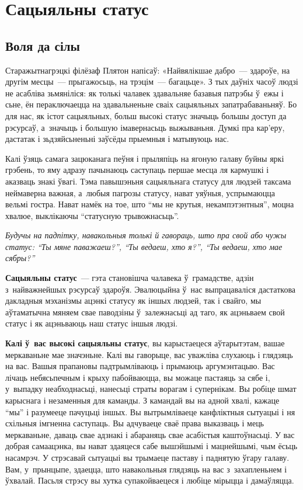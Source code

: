 \chapter{Сацыяльны статус}

\section{Воля да сілы}

Старажытнагрэцкі філёзаф Плятон напісаў: «Найвялікшае дабро~--- здароўе, на другім месцы~--- прыгажосьць, на трэцім~--- багацьце». З тых даўніх часоў людзі не асабліва зьмяніліся: як толькі чалавек здавальняе базавыя патрэбы ў~ежы і сьне, ён пераключаецца на здавальненьне сваіх сацыяльных запатрабаваньняў. Бо для нас, як істот сацыяльных, больш высокі статус значыць большы доступ да рэсурсаў, а~значыць і большую імавернасьць выжываньня. Думкі пра кар'еру, дастатак і зьдзяйсьненьні заўсёды прыемныя і матывуюць нас.

Калі ўзяць самага зацюканага пеўня і прыляпіць на ягоную галаву буйны яркі грэбень, то яму адразу пачынаюць саступаць першае месца ля кармушкі і аказваць знакі ўвагі. Тэма павышэньня сацыяльнага статусу для людзей таксама неймаверна важная, а~любыя пагрозы статусу, нават уяўныя, успрымаюцца вельмі гостра. Нават намёк на тое, што ``мы не крутыя, некампэтэнтныя'', моцна хвалюе, выклікаючы ``статусную трывожнасьць''.

\emph{Будучы на падпітку, навакольныя толькі й гавораць, што пра свой або чужы статус: ``Ты мяне паважаеш?'', ``Ты ведаеш, хто я?'', ``Ты ведаеш, хто мае сябры?''}

\textbf{Сацыяльны статус}~--- гэта становішча чалавека ў~грамадстве, адзін з~найважнейшых рэсурсаў здароўя. Эвалюцыйна ў~нас выпрацаваліся дастаткова дакладныя мэханізмы ацэнкі статусу як іншых людзей, так і свайго, мы аўтаматычна мяняем свае паводзіны ў~залежнасьці ад таго, як ацэньваем свой статус і як ацэньваюць наш статус іншыя людзі.


\textbf{Калі ў~вас высокі сацыяльны статус}, вы карыстаецеся аўтарытэтам, вашае меркаваньне мае значэньне. Калі вы гаворыце, вас уважліва слухаюць і глядзяць на вас. Вашыя прапановы падтрымліваюць і прымаюць аргумэнтацыю. Вас лічаць небясьпечным і крыху пабойваюцца, вы можаце пастаяць за сябе і, у~выпадку неабходнасьці, нанесьці страты ворагам і супернікам. Вы робіце шмат карыснага і незаменныя для каманды. З камандай вы на адной хвалі, кажаце ``мы'' і разумееце пачуцьці іншых. Вы вытрымліваеце канфліктныя сытуацыі і ня схільныя імгненна саступаць. Вы адчуваеце сваё права выказваць і мець меркаваньне, даваць свае адзнакі і абараняць свае асабістыя каштоўнасьці. У вас добрая самаацэнка, вы нават здаяцеся сабе вышэйшымі і мацнейшымі, чым ёсьць насамрэч. У стрэсавай сытуацыі вы трымаеце паставу і паднятую ўгару галаву. Вам, у~прынцыпе, здаецца, што навакольныя глядзяць на вас з~захапленьнем і ўхвалай. Пасьля стрэсу вы хутка супакойваецеся і любіце мірыцца і дамаўляцца.

